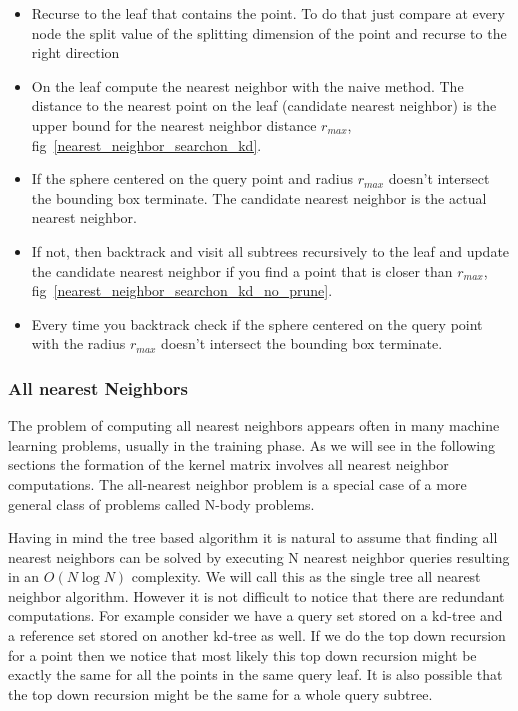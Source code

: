 \documentclass[12pt,letterpaper,doublespaced,ETD,dvips,proposal]{gtthesis}
\begin{document}
\begin{Body}
\begin{itemize}
   \item Recurse to the leaf that contains the point. To do that
   just compare at every node the split value of the splitting
   dimension of the point and recurse to the right direction
   \item On the leaf compute the nearest neighbor with the naive
   method. The distance to the nearest point on the leaf (candidate nearest neighbor)
   is the upper bound for the nearest neighbor distance $r_{max}$,
   fig~\ref{nearest_neighbor_searchon_kd}.
   \item If the sphere centered on the query point and radius
   $r_{max}$ doesn't intersect the bounding box terminate. The
   candidate nearest neighbor is the actual nearest neighbor.
   \item If not, then backtrack and visit all subtrees recursively
   to the leaf and update the candidate nearest neighbor if you find
   a point that is closer than $r_{max}$, fig~\ref{nearest_neighbor_searchon_kd_no_prune}.
   \item Every time you backtrack check if the sphere centered on
   the query point with the radius $r_{max}$ doesn't intersect the
   bounding box terminate.
 \end{itemize}


\subsubsection{All nearest Neighbors}
The problem of computing all nearest neighbors appears often in many
machine learning problems, usually in the training phase. As we will
see in the following sections the formation of the kernel matrix
involves all nearest neighbor computations. The all-nearest neighbor
problem is a special case of a more general class of problems called
N-body problems.

Having in mind the tree based algorithm it is natural to assume that
finding all nearest neighbors can be solved by executing N nearest
neighbor queries resulting in an $O(N\log N)$ complexity. We will
call this as the single tree all nearest neighbor algorithm. However
it is not difficult to notice that there are redundant computations.
For example consider we have a query set stored on a kd-tree and a
reference set stored on another kd-tree as well. If we do the top
down recursion for a point then we notice that most likely this top
down recursion might be exactly the same for all the points in the
same query leaf. It is also possible that the top down recursion
might be the same for a whole query subtree.


\end{Body}
\end{document}
